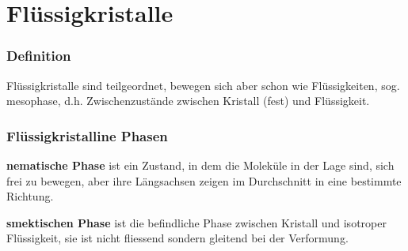 \section{Flüssigkristalle}

\subsubsection{Definition}
Flüssigkristalle sind teilgeordnet, bewegen sich aber schon wie Flüssigkeiten, sog. mesophase, d.h. Zwischenzustände zwischen Kristall (fest) und Flüssigkeit.

\subsubsection{Flüssigkristalline Phasen}
\textbf{nematische Phase} ist ein Zustand, in dem die Moleküle in der Lage sind, sich frei zu bewegen, aber ihre Längsachsen zeigen im Durchschnitt in eine bestimmte Richtung. 

\textbf{smektischen Phase} ist die befindliche Phase zwischen Kristall und isotroper Flüssigkeit, sie ist nicht fliessend sondern gleitend bei der Verformung.

